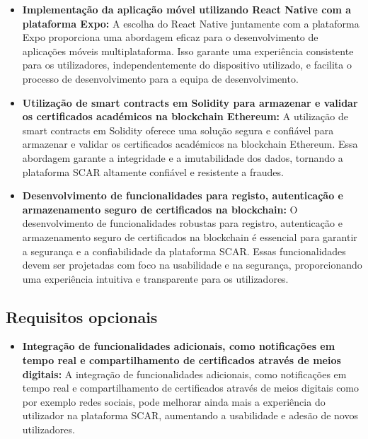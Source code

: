 \documentclass[10pt]{article}
\begin{document}
\begin{itemize}

    \item\textbf{Implementação da aplicação móvel utilizando React Native com a plataforma Expo:} A escolha do React Native
          juntamente com a plataforma Expo proporciona uma abordagem eficaz para o desenvolvimento de aplicações móveis
          multiplataforma. Isso garante uma experiência consistente para os utilizadores, independentemente do dispositivo
          utilizado, e facilita o processo de desenvolvimento para a equipa de desenvolvimento.

    \item\textbf{Utilização de smart contracts em Solidity para armazenar e validar os certificados académicos na blockchain
              Ethereum:} A utilização de smart contracts em Solidity oferece uma solução segura e confiável para armazenar
          e validar os certificados académicos na blockchain Ethereum. Essa abordagem garante a integridade e a
          imutabilidade dos dados, tornando a plataforma SCAR altamente confiável e resistente a fraudes.

    \item\textbf{Desenvolvimento de funcionalidades para registo, autenticação e armazenamento seguro de certificados na
              blockchain:} O desenvolvimento de funcionalidades robustas para registro, autenticação e armazenamento seguro
          de certificados na blockchain é essencial para garantir a segurança e a confiabilidade da plataforma SCAR.\@
          Essas funcionalidades devem ser projetadas com foco na usabilidade e na segurança, proporcionando uma
          experiência intuitiva e transparente para os utilizadores.

\end{itemize}

\subsection*{Requisitos opcionais}

\begin{itemize}

    \item\textbf{Integração de funcionalidades adicionais, como notificações em tempo real e compartilhamento de certificados
              através de meios digitais:} A integração de funcionalidades adicionais, como notificações em tempo real e
          compartilhamento de certificados através de meios digitais como por exemplo redes sociais, pode melhorar ainda mais a experiência do
          utilizador na plataforma SCAR, aumentando a usabilidade e adesão de novos utilizadores.

\end{itemize}
\end{document}
